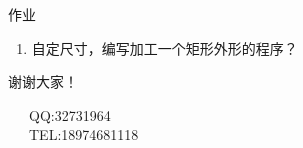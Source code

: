 \documentclass[UTF8,zihao=-4]{ctexbeamer}
\begin{document}
\begin{frame}{作业}
\begin{enumerate}
    \item 自定尺寸，编写加工一个矩形外形的程序？
\end{enumerate}
\end{frame}

\begin{frame}[plain]
\vfill

\centering \huge 谢谢大家！

\vfill

\flushleft \footnotesize   
~~~QQ:32731964\\
~~~TEL:18974681118\\

\end{frame}
\end{document}

